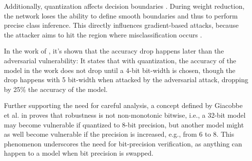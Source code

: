 Additionally, quantization affects decision boundaries \cite{gorslineAdversarialRobustnessQuantized2021}. During weight reduction, the network loses the ability to define smooth boundaries and thus to perform precise class inference. This directly influences gradient-based attacks, because the attacker aims to hit the region where misclassification occurs \cite{gorslineAdversarialRobustnessQuantized2021}.

In the work of \cite{goodfellowExplainingHarnessingAdversarial2015}, it's shown that the accuracy drop happens later than the adversarial vulnerability: It states that with quantization, the accuracy of the model in the work does not drop until a 4-bit bit-width is chosen, though the drop happens with 5 bit-width when attacked by the adversarial attack, dropping by 25\% the accuracy of the model.

Further supporting the need for careful analysis, a concept defined by Giacobbe et al. in \cite{giacobbe2020how} proves that robustness is not non-monotonic bitwise, i.e., a 32-bit model may become vulnerable if quantized to 8-bit precision, but another model might as well become vulnerable if the precision is increased, e.g., from 6 to 8. This phenomenon underscores the need for bit-precision verification, as anything can happen to a model when bit precision is swapped.


